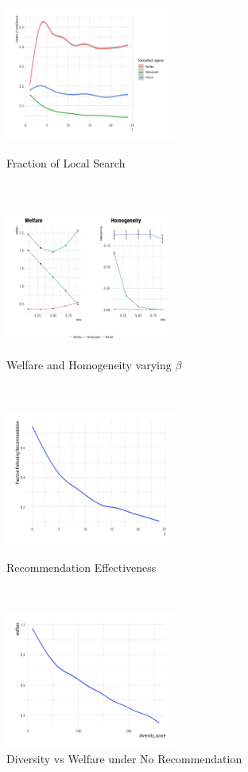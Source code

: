 \documentclass[sigconf]{acmart}
\begin{document}
\begin{figure}[!htbp]
    \centering
    \begin{minipage}[b]{0.5\textwidth}
        \centering
        \includegraphics[width=\linewidth, height=1.75in]{figures/local_moves_25}
        \caption{Fraction of Local Search}
        \label{fig:local_consumption}
    \end{minipage}%
    ~ 
    \begin{minipage}[b]{0.5\textwidth}
        \centering
        \includegraphics[width=\linewidth, height=1.75in]{figures/welfare_homo_combo}
        \caption{Welfare and Homogeneity varying $\beta$}
        \label{fig:beta_vary}
    \end{minipage}
    ~ \\
     \begin{minipage}{0.48\textwidth}
     \centering
     \includegraphics[width=\linewidth, height=1.75in]{figures/rec_obedience_25}
     \caption{Recommendation Effectiveness}\label{fig:rec_obey}
   \end{minipage}\hfill
   ~
   \begin{minipage}{0.48\textwidth}
     \centering
     \includegraphics[width=\linewidth, height=1.75in]{"figures/Diversity vs Welfare - No Recommendation"}
     \caption{ Diversity vs Welfare under No Recommendation}\label{fig:diversity_welfare_no_rec}
   \end{minipage}
\end{figure}
\end{document}
